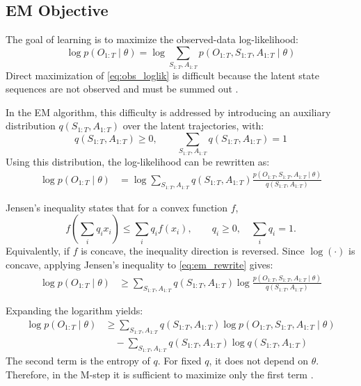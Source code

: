 \subsection{EM Objective}

The goal of learning is to maximize the observed-data log-likelihood:
\begin{equation}
\log p(O_{1:T}\mid \theta)
=
\log \sum_{S_{1:T},A_{1:T}}
p(O_{1:T},S_{1:T},A_{1:T}\mid \theta)
\label{eq:obs_loglik}
\end{equation}
Direct maximization of \eqref{eq:obs_loglik} is difficult because the latent state
sequences are not observed and must be summed out \cite{Dempster1977,pml1Book}.

In the \ac{EM} algorithm, this difficulty is addressed by introducing an auxiliary distribution \(q(S_{1:T},A_{1:T})\) over the latent trajectories, with:
\begin{equation}
q(S_{1:T},A_{1:T}) \ge 0, 
\qquad 
\sum_{S_{1:T},A_{1:T}} q(S_{1:T},A_{1:T}) = 1
\end{equation}
Using this distribution, the log-likelihood can be rewritten as:
\begin{align}
\log p(O_{1:T}\mid \theta)
&=
\log \sum_{S_{1:T},A_{1:T}}
q(S_{1:T},A_{1:T})
\frac{p(O_{1:T},S_{1:T},A_{1:T}\mid \theta)}
{q(S_{1:T},A_{1:T})}
\label{eq:em_rewrite}
\end{align}

Jensen's inequality states that for a convex function \(f\),
\begin{equation}
f\!\left(\sum_i q_i x_i\right)
\le
\sum_i q_i f(x_i),
\qquad
q_i \ge 0,
\quad
\sum_i q_i = 1.
\label{eq:jensen_convex}
\end{equation}
Equivalently, if \(f\) is concave, the inequality direction is reversed. Since
\(\log(\cdot)\) is concave, applying Jensen's inequality to \eqref{eq:em_rewrite} gives:
\begin{align}
\log p(O_{1:T}\mid \theta)
&\ge
\sum_{S_{1:T},A_{1:T}}
q(S_{1:T},A_{1:T})
\log
\frac{p(O_{1:T},S_{1:T},A_{1:T}\mid \theta)}
{q(S_{1:T},A_{1:T})}
\label{eq:em_lower_bound}
\end{align}

Expanding the logarithm yields:
\begin{align}
\log p(O_{1:T}\mid \theta)
&\ge
\sum_{S_{1:T},A_{1:T}}
q(S_{1:T},A_{1:T})
\log p(O_{1:T},S_{1:T},A_{1:T}\mid \theta)
\nonumber\\
&\quad-
\sum_{S_{1:T},A_{1:T}}
q(S_{1:T},A_{1:T})\log q(S_{1:T},A_{1:T})
\label{eq:em_bound_expanded}
\end{align}
The second term is the entropy of \(q\). For fixed \(q\), it does not depend on
\(\theta\). Therefore, in the M-step it is sufficient to maximize only the first term \cite{Dempster1977,pml1Book}.


